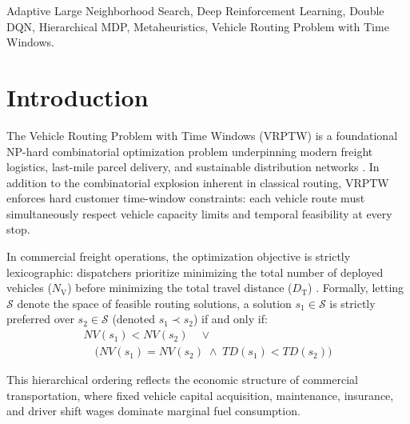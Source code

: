 \documentclass{ieeeaccess}
\newcommand{\NV}{{N_\mathrm{V}}}
\newcommand{\TD}{{D_\mathrm{T}}}
\begin{document}
\begin{keywords}
Adaptive Large Neighborhood Search, Deep Reinforcement Learning, Double DQN, Hierarchical MDP, Metaheuristics, Vehicle Routing Problem with Time Windows.
\end{keywords}

\titlepgskip=-15pt

\maketitle

\titlepgskip=11pt

\section{Introduction}
\label{sec:introduction}

The Vehicle Routing Problem with Time Windows (VRPTW) is a foundational NP-hard combinatorial optimization problem underpinning modern freight logistics, last-mile parcel delivery, and sustainable distribution networks \cite{Dantzig1959, Solomon1987}. In addition to the combinatorial explosion inherent in classical routing, VRPTW enforces hard customer time-window constraints: each vehicle route must simultaneously respect vehicle capacity limits and temporal feasibility at every stop.

In commercial freight operations, the optimization objective is strictly lexicographic: dispatchers prioritize minimizing the total number of deployed vehicles ($\NV$) before minimizing the total travel distance ($\TD$) \cite{Toth2014, braysy2005vehicle}. Formally, letting $\mathcal{S}$ denote the space of feasible routing solutions, a solution $s_1 \in \mathcal{S}$ is strictly preferred over $s_2 \in \mathcal{S}$ (denoted $s_1 \prec s_2$) if and only if:
\begin{multline}
  NV(s_1) < NV(s_2) \quad \lor \\
  \quad \big(NV(s_1) = NV(s_2) \;\land\; TD(s_1) < TD(s_2)\big)
  \label{eq:lexicographic_intro}
\end{multline}

This hierarchical ordering reflects the economic structure of commercial transportation, where fixed vehicle capital acquisition, maintenance, insurance, and driver shift wages dominate marginal fuel consumption.
\end{document}
